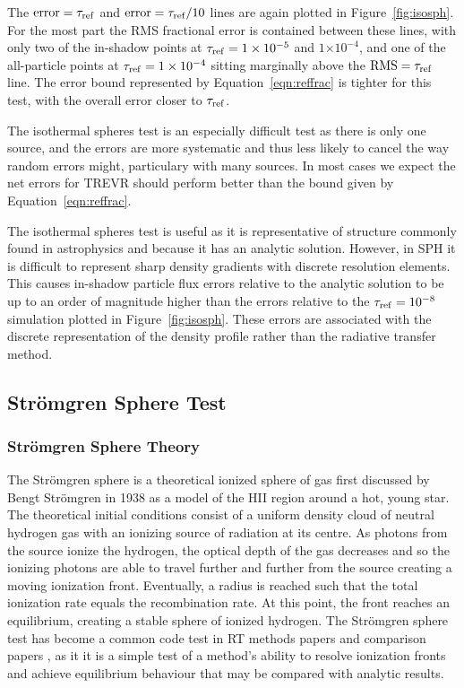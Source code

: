 \documentclass[fleq,usenatbib]{mnras}
\newcommand{\acro}{TREVR}
\providecommand{\e}[1]{\ensuremath{\times10^{#1}}}
\newcommand{\tr}{\tau_{\rm ref}}
\newcommand{\strom}{Str\"omgren}
\begin{document}
{The $\rm{error}=\tr$ and $\rm{error}=\tr/10$ lines are again plotted in 
Figure~\ref{fig:isosph}. For the most part the RMS fractional error is 
contained between these lines, with only two of the in-shadow points at 
$\tr=1\e{-5}$ and $1\e{-4}$,  and one of the all-particle points at  
$\tr=1\e{-4}$ sitting marginally above the $\rm{RMS}=\tr$ line. The error 
bound represented by Equation~\ref{eqn:reffrac} is tighter for this test, with 
the overall error closer to $\tr$.

The isothermal spheres test is an especially difficult test as there 
is only one source, and the errors are more systematic and thus less likely
to cancel the way random errors might, particulary with many sources.
In most cases we expect the net errors for \acro{} should perform better than the bound
given by Equation~\ref{eqn:reffrac}.

The isothermal spheres test is useful as it is representative of structure
commonly found in astrophysics and because it has an analytic solution. 
However, in SPH it is difficult to represent sharp density gradients with 
discrete resolution elements. This causes in-shadow particle flux errors relative 
to the analytic solution to be up to an order of magnitude higher than 
the errors relative to the $\tr = 10^{-8}$ simulation plotted in 
Figure~\ref{fig:isosph}. These errors are associated with the discrete 
representation
of the density profile rather than the radiative transfer method.

\subsection{\strom{} Sphere Test} \label{stromgren}
\subsubsection{\strom{} Sphere Theory}
The \strom{} sphere is a theoretical ionized sphere of gas first discussed by 
Bengt \strom{} in 1938 \citep{stromgren39} as a model of the HII region around 
a hot, young star. The theoretical initial conditions consist of a uniform 
density cloud of neutral hydrogen gas with an ionizing source of radiation at 
its centre. As photons from the source ionize the hydrogen, the optical depth 
of the gas decreases and so the ionizing photons are able to travel further 
and further from the source creating a moving ionization front.  Eventually,
a radius is reached such that the total ionization 
rate equals the recombination rate.  At this point, the front reaches an 
equilibrium, creating a stable sphere of ionized hydrogen. The \strom{} sphere 
test has become a common code test in RT methods papers \citep{pawlikSchaye08,
pawlikSchaye11, petkovaSpringel11} and comparison papers \citep{ilievEt06, 
ilievEt09}, as it it is a simple test of a method's ability to resolve 
ionization fronts and achieve equilibrium behaviour that may be compared with 
analytic results.

}
\end{document}
